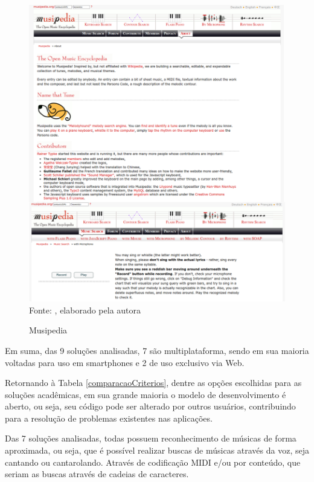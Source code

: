 \begin{figure}[!htb]
   \centering
   \caption{Musipedia}\label{fig:musipedia} 
   \includegraphics[scale=0.40]{figuras/musipedia.png}
   \\Fonte: \cite{musipedia}, elaborado pela autora
\end{figure}

Em suma, das 9 soluções analisadas, 7 são multiplataforma, sendo em sua maioria voltadas para uso em smartphones e 2 de uso exclusivo via Web.

Retornando à Tabela \ref{comparacaoCriterios}, dentre as opções escolhidas para as soluções acadêmicas, em sua grande maioria o modelo de desenvolvimento é aberto, ou seja, seu código pode ser alterado por outros usuários, contribuindo para a resolução de problemas existentes nas aplicações. 

Das 7 soluções analisadas, todas possuem reconhecimento de músicas de forma aproximada, ou seja, que é possível realizar buscas de músicas através da voz, seja cantando ou cantarolando. Através de codificação MIDI e/ou por conteúdo, que seriam as buscas através de cadeias de caracteres.

